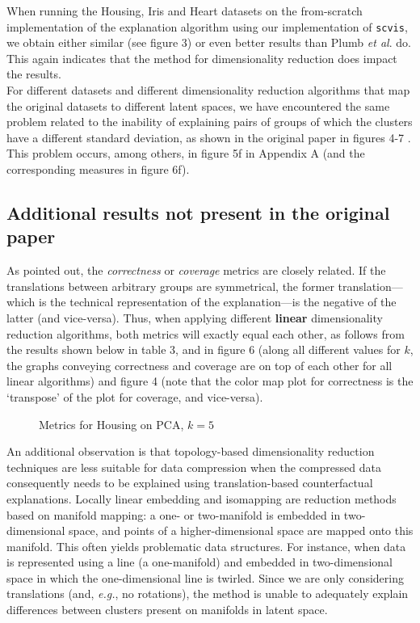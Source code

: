 When running the Housing, Iris and Heart datasets on the from-scratch implementation of the explanation algorithm using our implementation of \texttt{scvis}, we obtain either similar (see figure 3) or even better results than Plumb \textit{et al}. do. This again indicates that the method for dimensionality reduction does impact the results.\\

For different datasets and different dimensionality reduction algorithms that map the original datasets to different latent spaces, we have encountered the same problem related to the inability of explaining pairs of groups of which the clusters have a different standard deviation, as shown in the original paper in figures 4-7 \citep[p.~4]{plumb2020explaining}. This problem occurs, among others, in figure 5f in Appendix A (and the corresponding measures in figure 6f).

\subsection{Additional results not present in the original paper}

As \citep[p.~6]{plumb2020explaining} pointed out, the \textit{correctness} or \textit{coverage} metrics are closely related. If the translations between arbitrary groups are symmetrical, the former translation---which is the technical representation of the explanation---is the negative of the latter (and vice-versa). Thus, when applying different \textbf{linear} dimensionality reduction algorithms, both metrics will exactly equal each other, as follows from the results shown below in table 3, and in figure 6 (along all different values for $k$, the graphs conveying correctness and coverage are on top of each other for all linear algorithms) and figure 4 (note that the color map plot for correctness is the `transpose' of the plot for coverage, and vice-versa).\\

\begin{figure}
  \scalebox{0.12}{}
  \caption{Metrics for Housing on PCA, $k = 5$}
\end{figure}

An additional observation is that topology-based dimensionality reduction techniques are less suitable for data compression when the compressed data consequently needs to be explained using translation-based counterfactual explanations. Locally linear embedding and isomapping are reduction methods based on manifold mapping: a one- or two-manifold is embedded in two-dimensional space, and points of a higher-dimensional space are mapped onto this manifold. This often yields problematic data structures. For instance, when data is represented using a line (a one-manifold) and embedded in two-dimensional space in which the one-dimensional line is twirled. Since we are only considering translations (and, \textit{e.g.}, no rotations), the method is unable to adequately explain differences between clusters present on manifolds in latent space.\\

